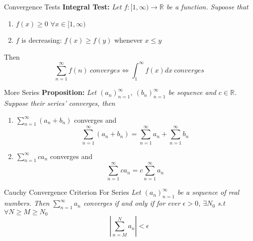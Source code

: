 \documentclass{article}
\begin{document}
\begin{multicols*}{3}
\begin{blackbox}{Convergence Tests}
        \textbf{Integral Test:}\textit{ Let $f: [1,\infty)\rightarrow \mathbb{R}$ be a function. Supoose that}\\[1ex]
        \begin{enumerate}[label=(\roman*)]
            \item $f(x) \geq 0$ $\forall x \in [1,\infty)$
            \item $f$ is decreasing: $f(x) \geq f(y)$ whenever $x \leq y$
        \end{enumerate}
        Then 
        \[\sum_{n=1}^\infty f(n) \ converges \iff \int_1^\infty f(x) dx \ converges\]
\end{blackbox}


\begin{blackbox}{More Series}
\textbf{Proposition:} \textit{Let $(a_n)_{n=1}^\infty$, $(b_n)_{n=1}^\infty$ be sequence and $c \in \mathbb{R}$. Suppose their series' converges, then}
\begin{enumerate}[label=(\alph*)]
    \item $\sum\limits_{n=1}^\infty(a_n + b_n)$ converges and 
    \[\sum_{n=1}^\infty (a_n + b_n) = \sum_{n=1}^\infty a_n + \sum_{n=1}^\infty b_n\]
    \item $\sum\limits_{n=1}^\infty ca_n$ converges and
    \[\sum_{n=1}^\infty ca_n = c\sum_{n=1}^\infty a_n\]
\end{enumerate}
    \begin{brownbox}{Cauchy Convergence Criterion For Series}
        \textit{Let $(a_n)_{n=1}^\infty$ be a sequence of real numbers. Then $\sum\limits_{n=1}^\infty a_n$ converges if and only if for ever $\epsilon > 0$, $\exists N_0$ s.t $\forall N \geq M \geq N_0$}
        \[\left| \sum_{n=M}^N a_n \right| < \epsilon\]
    \end{brownbox}\\[-3ex]
\end{blackbox}


\end{multicols*}
\end{document}
